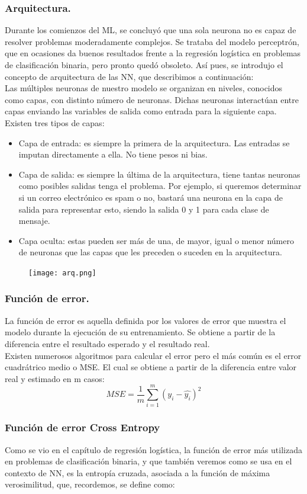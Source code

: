 \documentclass[a4paper,10pt]{article}
\begin{document}
\subsubsection{Arquitectura.}
Durante los comienzos del ML, se concluyó que una sola neurona no es capaz de
resolver problemas moderadamente complejos. Se trataba del modelo perceptrón,
que en ocasiones da buenos resultados frente a la regresión logística en problemas
de clasificación binaria, pero pronto quedó obsoleto. Así pues, se introdujo el
concepto de arquitectura de las NN, que describimos a continuación:\\
Las múltiples neuronas de nuestro modelo se organizan en niveles, conocidos como capas, con distinto número de neuronas. Dichas neuronas interactúan entre capas enviando las variables de salida como entrada para la siguiente capa.
Existen tres tipos de capas:
\begin{itemize}
    \item Capa de entrada: es siempre la primera de la arquitectura. Las entradas se imputan directamente a ella. No tiene pesos ni bias.
    \item Capa de salida: es siempre la última de la arquitectura, tiene tantas neuronas como posibles salidas tenga el problema. Por ejemplo, si queremos determinar si un correo electrónico es spam o no, bastará una neurona en la capa de salida para representar esto, siendo la salida 0 y 1 para cada clase de mensaje. 
    \item Capa oculta: estas pueden ser más de una, de mayor, igual o menor número de neuronas que las capas que les preceden o suceden en la arquitectura.
\end{itemize} 
\begin{figure}[H]
\centering
\texttt{[image: arq.png]}
\end{figure}
\subsubsection{Función de error.}
La función de error es aquella definida por los valores de error que muestra el modelo durante la ejecución de su entrenamiento. Se obtiene a partir de la diferencia entre el resultado esperado y el resultado real.\\ Existen numerosos algoritmos para calcular el error pero el más común es el error cuadrátrico medio o MSE. El cual se obtiene a partir de la diferencia entre valor real y estimado en m casos:
\[
MSE=\frac{1}{m}\sum_{i=1}^m (y_i - \hat{y_i})^2
\]
\subsubsection{Función de error Cross Entropy}
Como se vio en el capítulo de regresión logística, la función de error más
utilizada en problemas de clasificación binaria, y que también veremos como se
usa en el contexto de NN, es la entropía cruzada, asociada a la función de máxima
verosimilitud, que, recordemos, se define como:
\end{document}
